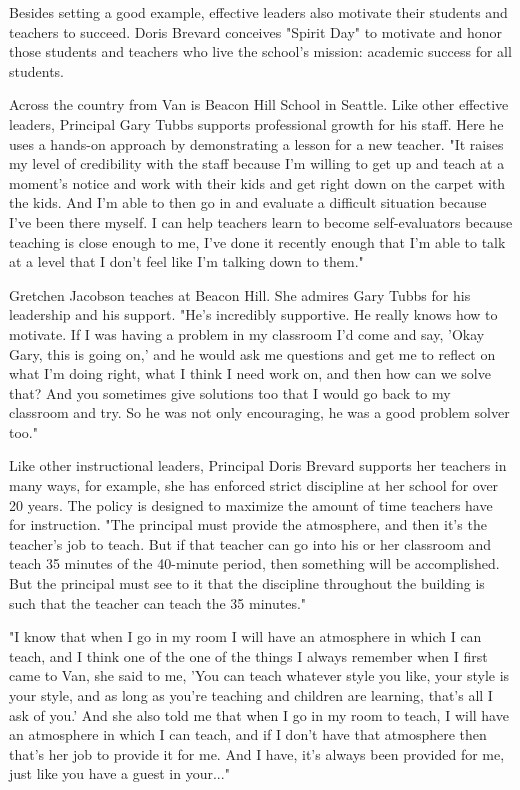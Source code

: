 Besides setting a good example, effective leaders also motivate their students and teachers to succeed.
Doris Brevard conceives "Spirit Day" to motivate and honor those students and teachers who live the school's mission: academic success for all students.

Across the country from Van is Beacon Hill School in Seattle.
Like other effective leaders, Principal Gary Tubbs supports professional growth for his staff.
Here he uses a hands-on approach by demonstrating a lesson for a new teacher.
"It raises my level of credibility with the staff because I'm willing to get up and teach at a moment's notice and work with their kids and get right down on the carpet with the kids.
And I'm able to then go in and evaluate a difficult situation because I've been there myself.
I can help teachers learn to become self-evaluators because teaching is close enough to me, I've done it recently enough that I'm able to talk at a level that I don't feel like I'm talking down to them."

Gretchen Jacobson teaches at Beacon Hill.
She admires Gary Tubbs for his leadership and his support.
"He's incredibly supportive.
He really knows how to motivate.
If I was having a problem in my classroom I'd come and say, 'Okay Gary, this is going on,' and he would ask me questions and get me to reflect on what I'm doing right, what I think I need work on, and then how can we solve that?
And you sometimes give solutions too that I would go back to my classroom and try.
So he was not only encouraging, he was a good problem solver too."

Like other instructional leaders, Principal Doris Brevard supports her teachers in many ways, for example, she has enforced strict discipline at her school for over 20 years.
The policy is designed to maximize the amount of time teachers have for instruction.
"The principal must provide the atmosphere, and then it's the teacher's job to teach.
But if that teacher can go into his or her classroom and teach 35 minutes of the 40-minute period, then something will be accomplished.
But the principal must see to it that the discipline throughout the building is such that the teacher can teach the 35 minutes."

"I know that when I go in my room I will have an atmosphere in which I can teach, and I think one of the one of the things I always remember when I first came to Van, she said to me, 'You can teach whatever style you like, your style is your style, and as long as you're teaching and children are learning, that's all I ask of you.' And she also told me that when I go in my room to teach, I will have an atmosphere in which I can teach, and if I don't have that atmosphere then that's her job to provide it for me.
And I have, it's always been provided for me, just like you have a guest in your..."

